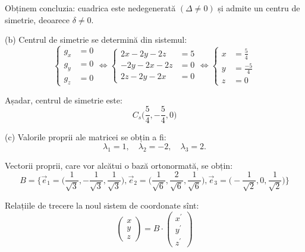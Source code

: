 \documentclass[11pt,a4paper]{article}
\theoremstyle{dotless}
\theoremstyle{dotlessdr}
\begin{document}
Obținem concluzia: cuadrica este nedegenerată $(\Delta \neq 0)$ și admite un
centru de simetrie, deoarece $\delta \neq 0$.

(b) Centrul de simetrie se determină din sistemul: 
 \[
	\begin{cases}	
	    g_x &= 0 \\
	    g_y &= 0 \\
	    g_z &= 0
    \end{cases} \Longleftrightarrow 
    \begin{cases}	
	    2x - 2y - 2z &= 5 \\
	    -2y - 2x - 2z &= 0\\
        2z - 2y - 2x &= 0
    \end{cases} \Longleftrightarrow 
    \begin{cases}	
	    x &= \frac{5}{4} \\
	    y &= \frac{-5}{4} \\
	    z &= 0
    \end{cases}
\]

Așadar, centrul de simetrie este: \[
    C_s\Big( \dfrac{5}{4}, - \dfrac{5}{4}, 0 \Big)
\]

(c) Valorile proprii ale matricei se obțin a fi: 
 \[
	\lambda_1 = 1, \quad \lambda_2 = -2, \quad \lambda_3 = 2.
\]

Vectorii proprii, care vor alcătui o bază ortonormată, se obțin: 
 \[
	B = \Big\{ \vec{e}_1 = \Big( \dfrac{1}{\sqrt{3}},
	                            -\dfrac{1}{\sqrt{3}},
	                             \dfrac{1}{\sqrt{3}} \Big),
	           \vec{e}_2 = \Big( \dfrac{1}{\sqrt{6}},
	                             \dfrac{2}{\sqrt{6}},
	                              \dfrac{1}{\sqrt{6}}\Big),
	            \vec{e}_3 = \Big( -\dfrac{1}{\sqrt{2}}, 
	                                0,
	                               \dfrac{1}{\sqrt{2}} \Big) \Big\}
\]

Relațiile de trecere la noul sistem de coordonate sînt: 
 \[
	\begin{pmatrix}
	    x \\ y \\ z
    \end{pmatrix} = B \cdot \begin{pmatrix}
	                            x^{\prime} \\
	                            y^{\prime} \\
	                            z^{\prime}
                            \end{pmatrix}
\]
\end{document}
